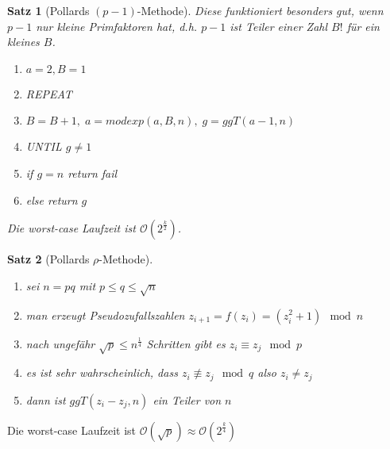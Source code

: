 \documentclass[a4paper, 12pt]{article}
\theoremstyle{plain}
\newtheorem{theorem}{Satz}[subsection] %
\theoremstyle{definition}
\theoremstyle{lemma}
\theoremstyle{remark}
\theoremstyle{corollary}
\theoremstyle{example}
\begin{document}
	\begin{theorem}[Pollards $(p-1)$-Methode]
		Diese funktioniert besonders gut, wenn $p-1$ nur kleine Primfaktoren hat, d.h. $p-1$ ist Teiler einer Zahl $B!$ für ein kleines $B$.
		\begin{enumerate}
			\item $a = 2, B=1$
			\item REPEAT
			\item $B = B+1,\; a = modexp(a,B,n),\; g = ggT(a-1,n)$
			\item UNTIL $g \neq 1$
			\item if $g=n$ return \textit{fail}
			\item else return $g$ 
		\end{enumerate}
		Die worst-case Laufzeit ist $\mathcal{O}(2^{\frac{k}{2}})$.
	\end{theorem}
	\begin{theorem}[Pollards $\rho$-Methode]
		\begin{enumerate}
			\item sei $n=pq$ mit $p\leq q\leq \sqrt{n}$
			\item man erzeugt Pseudozufallszahlen $z_{i+1} = f(z_i) = (z_i^2 + 1) \mod n$
			\item nach ungefähr $\sqrt{p} \leq n^{\frac{1}{4}}$ Schritten gibt es $z_i \equiv z_j \mod p$
			\item es ist sehr wahrscheinlich, dass $z_i \not \equiv z_j \mod q$ also $z_i \neq z_j$
			\item dann ist $ggT(z_i-z_j,n)$ ein Teiler von $n$
		\end{enumerate}
	\end{theorem}
	Die worst-case Laufzeit ist $\mathcal{O}(\sqrt{p}) \approx \mathcal{O}(2^{\frac{k}{4}})$
\end{document}
